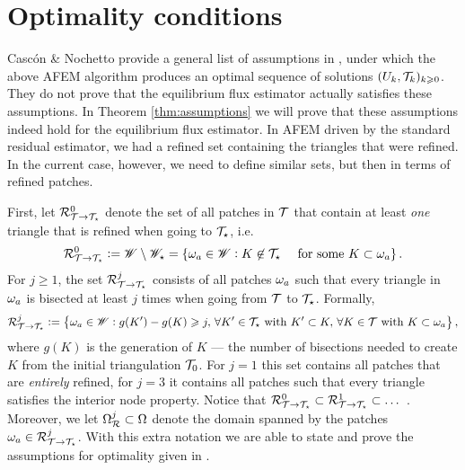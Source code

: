 \documentclass[thesis.tex]{subfiles}
\begin{document}
\section{Optimality conditions}
Casc\'on \& Nochetto provide a general list of assumptions in \cite[\S 4]{cascon2012}, under which the above AFEM algorithm produces
an optimal sequence of solutions $(U_k, \mathcal{T}_k)_{k \geqslant 0}$.
They do not prove that the equilibrium flux estimator actually  satisfies these assumptions.
In Theorem \ref{thm:assumptions} we will prove that these
assumptions indeed hold for the equilibrium flux estimator.
In AFEM driven by the standard residual estimator, we had a refined set containing the triangles that were refined.
In the current case, however, we need to define similar sets, but then in terms of refined patches.

First, let $\mathcal{R}^0_{\mathcal{T} \to \mathcal{T}_\star}$ denote the set of all patches in $\mathcal{T}$ that contain at least \emph{one} triangle that is refined when going to $\mathcal{T}_\star$, i.e.
\[
\mathcal{R}^0_{\mathcal{T} \to \mathcal{T}_\star} := \mathscr{W} \setminus \mathscr{W}_\star =  \set{ \omega_a \in \mathscr{W}:  K \not \in \mathcal{T}_\star\quad \text{ for some }  K \subset \omega_a}.
\]
For $j \geq 1$, the set $\mathcal{R}^j_{\mathcal{T} \to \mathcal{T}_\star}$ consists of all patches $\omega_a$ such that every triangle in $\omega_a$ is bisected at least $j$  times when going from $\mathcal{T}$ to $\mathcal{T}_\star$.
Formally, 
\[
  \mathcal{R}^j_{\mathcal{T} \to \mathcal{T}_\star} := \set{ \omega_a \in \mathscr{W}: g(K') - g(K) \geqslant j,  \, \forall K' \in \mathcal{T}_\star \text{ with } K' \subset K, \, \forall K \in \mathcal{T}\text{ with } K \subset \omega_a},
\]
where $g(K)$ is the generation of $K$ --- the number of bisections needed to create $K$ from the initial triangulation $\mathcal{T}_0$. For $j=1$ this set contains
all patches that are \emph{entirely} refined, for $j=3$ it contains all patches such that every triangle satisfies the interior node property.
Notice that $\mathcal{R}^0_{\mathcal{T} \to \mathcal{T}_\star} \subset \mathcal{R}^1_{\mathcal{T} \to \mathcal{T}_\star} \subset \dots$ . Moreover, we let $\Omega_{\mathcal{R}}^j \subset \Omega$ denote the domain
spanned by the patches $\omega_a \in \mathcal{R}^j_{\mathcal{T} \to \mathcal{T}_\star}$.
With this extra notation we are able to state and prove the assumptions for optimality given in \cite{cascon2012}.
\end{document}
